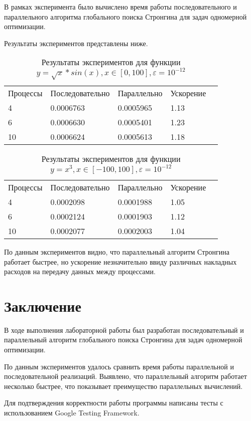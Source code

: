 \documentclass{report}
\begin{document}
\par В рамках эксперимента было вычислено время работы последовательного и параллельного алгоритма глобального поиска Стронгина для задач одномерной оптимизации.
\par Результаты экспериментов представлены ниже.

\begin{table}[!h]
\caption{Результаты экспериментов для функции $y = \sqrt{x}*sin(x), x \in [0, 100], \varepsilon = 10^{-12}$}
\centering
\begin{tabular}{lllll}
Процессы & Последовательно & Параллельно & Ускорение  \\
4        & 0.0006763         & 0.0005965     & 1.13       \\
6        & 0.0006630         & 0.0005401     & 1.23       \\
10       & 0.0006624         & 0.0005613     & 1.18       
\end{tabular}
\end{table}

\begin{table}[!h]
\caption{Результаты экспериментов для функции $y = x^3, x \in [-100, 100], \varepsilon = 10^{-12}$}
\centering
\begin{tabular}{lllll}
Процессы & Последовательно & Параллельно & Ускорение  \\
4        & 0.0002098         & 0.0001988     & 1.05       \\
6        & 0.0002124         & 0.0001903     & 1.12       \\
10       & 0.0002077         & 0.0002003     & 1.04       
\end{tabular}
\end{table}

\par По данным экспериментов видно, что параллельный алгоритм Стронгина работает быстрее, но ускорение незначительно ввиду различных накладных расходов на передачу данных между процессами.
\newpage

\section*{Заключение}
В ходе выполнения лабораторной работы был разработан последовательный и параллельный алгоритм глобального поиска Стронгина для задач одномерной оптимизации.
\par По данным экспериментов удалось сравнить время работы параллельной и последовательной реализаций. Выявлено, что параллельный алгоритм работает несколько быстрее, что показывает преимущество параллельных вычислений.
\par Для подтверждения корректности работы программы написаны тесты с использованием Google Testing Framework.
\newpage
\end{document}
